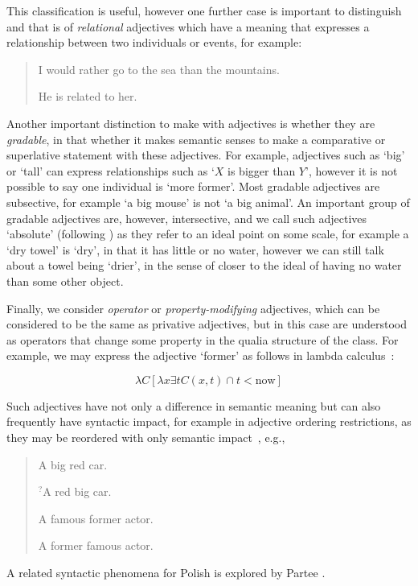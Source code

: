 \documentclass[11pt]{article}
\begin{document}
This classification is useful, however one further case is important to 
distinguish and that is of \emph{relational} adjectives which have a meaning 
that expresses a relationship between two individuals or events, for example:

\begin{quote}
I would rather go to the sea than the mountains.

He is related to her.
\end{quote}

Another important distinction to make with adjectives is whether they are 
\emph{gradable}, in that whether it makes semantic senses to make a comparative 
or superlative statement with these adjectives. For example, adjectives such as 
`big' or `tall' can express relationships such as `$X$ is bigger than $Y$', 
however it is not possible to say one individual is `more former'. Most gradable 
adjectives are subsective, for example `a big mouse' is not `a big animal'. An 
important group of gradable adjectives are, however, intersective, and we call 
such adjectives `absolute' (following \cite{rusiecki1985adjectives}) as they 
refer to an ideal point on some scale, for example a `dry towel' is `dry', in 
that it has little or no water, however we can still talk about a towel being 
`drier', in the sense of closer to the ideal of having no water than some other 
object.

Finally, we consider \emph{operator} or \emph{property-modifying} adjectives, 
which can be considered to be the same as privative adjectives, but in this 
case are understood as operators that change some property in the qualia 
structure of the class. For example, we may express the adjective `former' 
as follows in lambda calculus~\cite{partee2003there}:

$$\lambda C [\lambda x \exists t C(x,t) \cap t < \mathrm{now}]$$

Such adjectives have not only a difference in semantic meaning but can also 
frequently have syntactic impact, for example in adjective ordering 
restrictions, as they may be reordered with only semantic 
impact~\cite{teodorescu2006adjective}, e.g.,

\begin{quote}
A big red car.

$^?$A red big car.

A famous former actor.

A former famous actor.
\end{quote}

A related syntactic phenomena for Polish is explored by Partee .
\end{document}
